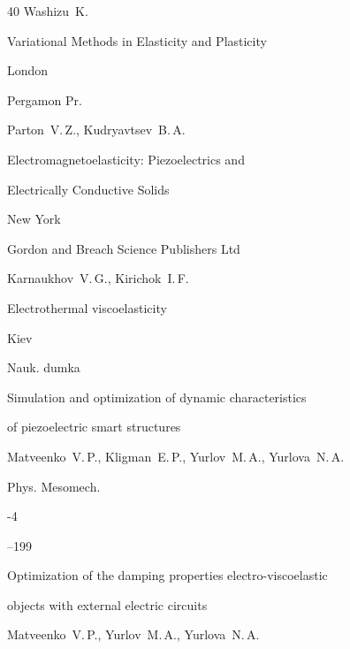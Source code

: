 \begin{thebibliography}{40}
\by Washizu~K.

\book Variational Methods in Elasticity and Plasticity

\publaddr London

\publ Pergamon Pr.






\by Parton~V.\,Z., Kudryavtsev~B.\,A.

\book Electromagnetoelasticity: Piezoelectrics and

Electrically Conductive Solids

\publaddr New York

\publ Gordon and Breach Science Publishers Ltd






\by Karnaukhov~V.\,G., Kirichok~I.\,F.

\book Electrothermal viscoelasticity

\publaddr Kiev

\publ Nauk. dumka







\paper Simulation and optimization of dynamic characteristics

of piezoelectric smart structures

\by Matveenko~V.\,P., Kligman~E.\,P., Yurlov~M.\,A., Yurlova~N.\,A.

\jour Phys. Mesomech.



-4

--199





\paper Optimization of the damping properties electro-viscoelastic

objects with external electric circuits

\by Matveenko~V.\,P., Yurlov~M.\,A., Yurlova~N.\,A.


\end{thebibliography}
